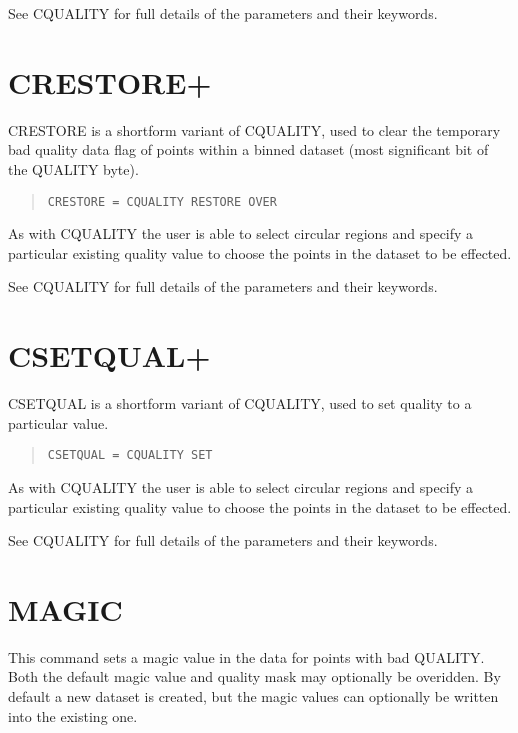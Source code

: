 \documentclass{book}
\renewcommand{\_}{{\tt\char'137}}     %
\begin{document}
See CQUALITY for full details of the parameters and their keywords.

\section{CRESTORE+}
CRESTORE is a shortform variant of CQUALITY, used to clear the
temporary bad quality data flag of points within a binned
dataset (most significant bit of the QUALITY byte).
\begin{quote}\begin{verbatim}
CRESTORE = CQUALITY RESTORE OVER
\end{verbatim}\end{quote}
As with CQUALITY the user is able to select circular regions and
specify a particular existing quality value to choose the points
in the dataset to be effected.

See CQUALITY for full details of the parameters and their keywords.

\section{CSETQUAL+}
CSETQUAL is a shortform variant of CQUALITY, used to set
quality to a particular value.
\begin{quote}\begin{verbatim}
CSETQUAL = CQUALITY SET
\end{verbatim}\end{quote}
As with CQUALITY the user is able to select circular regions and
specify a particular existing quality value to choose the points
in the dataset to be effected.

See CQUALITY for full details of the parameters and their keywords.

\section{MAGIC}
This command sets a magic value in the data for points with bad
QUALITY. Both the default magic value and quality mask may optionally
be overidden. By default a new dataset is created, but the magic
values can optionally be written into the existing one.
\end{document}
